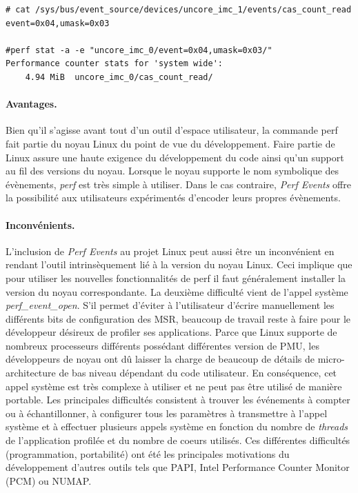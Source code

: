 \begin{verbatim}
# cat /sys/bus/event_source/devices/uncore_imc_1/events/cas_count_read
event=0x04,umask=0x03

#perf stat -a -e "uncore_imc_0/event=0x04,umask=0x03/"
Performance counter stats for 'system wide':
	4.94 MiB  uncore_imc_0/cas_count_read/
\end{verbatim}


        \paragraph{Avantages.} Bien qu'il s'agisse avant tout d'un outil d'espace utilisateur, la commande perf fait partie du noyau Linux du point de vue du développement. Faire partie de Linux assure une haute exigence du développement du code ainsi qu'un support au fil des versions du noyau. Lorsque le noyau supporte le nom symbolique des évènements, \textit{perf} est très simple à utiliser. Dans le cas contraire, \textit{Perf Events} offre la possibilité aux utilisateurs expérimentés d'encoder leurs propres évènements.
        

        \paragraph{Inconvénients.} L'inclusion de \textit{Perf Events} au projet Linux peut aussi être un inconvénient en rendant l'outil intrinsèquement lié à la version du noyau Linux. Ceci implique que pour utiliser les nouvelles fonctionnalités de perf il faut généralement installer la version du noyau correspondante. La deuxième difficulté vient de l'appel système \textit{perf\_event\_open}. S'il permet d'éviter à l'utilisateur d'écrire manuellement les différents bits de configuration des MSR, beaucoup de travail reste à faire pour le développeur désireux de profiler ses applications. Parce que Linux supporte de nombreux processeurs différents possédant différentes version de PMU, les développeurs de noyau ont dû laisser la charge de beaucoup de détails de micro-architecture de bas niveau dépendant du code utilisateur. En conséquence, cet appel système est très complexe à utiliser et ne peut pas être utilisé de manière portable. Les principales difficultés consistent à trouver les événements à compter ou à échantillonner, à configurer tous les paramètres à transmettre à l'appel système et à effectuer plusieurs appels système en fonction du nombre de \textit{threads} de l'application profilée et du nombre de coeurs utilisés. Ces différentes difficultés (programmation, portabilité) ont été les principales motivations du développement d'autres outils tels que PAPI, Intel Performance Counter Monitor (PCM) ou NUMAP\cite{Selva2017}.


